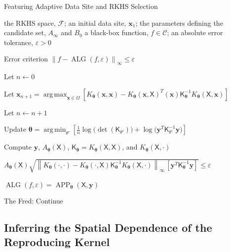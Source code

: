 \documentclass[]{mcom-l}
\theoremstyle{remark}
\DeclareMathOperator*{\argmax}{arg\,max}
\DeclareMathOperator*{\argmin}{arg\,min}
\DeclareMathOperator{\ALG}{ALG}
\DeclareMathOperator{\APP}{APP}
\newcommand{\mK}{\mathsf{K}}
\newcommand{\mX}{\mathsf{X}}
\newcommand{\bx}{{\boldsymbol{x}}}
\newcommand{\by}{{\boldsymbol{y}}}
\newcommand{\btheta}{{\boldsymbol{\theta}}}
\newcommand{\cc}{\mathcal{C}}
\newcommand{\calf}{{\mathcal{F}}}
\newcommand{\norm}[2][{}]{\ensuremath{\left \lVert #2 \right \rVert}_{#1}}
\newcommand{\FredNote}[1]{{\color{blue}Fred: #1}}
\begin{document}
\begin{algorithm}[H]
	\caption{Featuring Adaptive Data Site and RKHS Selection \label{alg:adaptsample}}
	\begin{algorithmic}
		\PARAM the RKHS space, $\calf$; an initial data site, $\bx_1$; the parameters defining the candidate set, $A_\infty$ and $B_0$
		\INPUT a black-box function, $f \in \cc$; an absolute error tolerance, $\varepsilon>0$
		
		\Ensure Error criterion $\norm[\infty]{f - \ALG(f,\varepsilon)} \le \varepsilon$
		
		\State Let $n \leftarrow 0$
		
		\Repeat
		
		
		\State Let $ \bx_{n+1} = \displaystyle \argmax_{\bx \in \Omega} [K_\btheta(\bx,\bx) - K_\btheta(\bx,\mX)^T(\bx) \mK_\btheta^{-1} K_\btheta(\mX,\bx)]$
		
		\EndIf
		
		\State Let $n \leftarrow n + 1$
		
		\State Update $\displaystyle\btheta = \argmin_{\theta'}  \left[\frac 1n \log \bigl( \det(\mK_{\theta'}) \bigr) + \log \bigl ( \by^T \mK_{\theta'}^{-1} \by \bigr)\right]$
		
		\State Compute $\by$, $A_\btheta(\mX)$, $\mK_\btheta = K_\btheta(\mX,\mX)$, and $K_\btheta(\mX,\cdot)$
		
		\Until $A_\btheta(\mX) \sqrt{\norm[\infty]{K_\btheta(\cdot,\cdot) - K_\btheta(\cdot,\mX) \mK_\btheta^{-1} K_\btheta(\mX,\cdot)} \, [\by^T \mK_\btheta^{-1} \by] }  \le \varepsilon$
		
		\RETURN $\ALG(f,\varepsilon) = \APP_\btheta(\mX,\by)$
		
	\end{algorithmic}
\end{algorithm}




The \FredNote{Continue}
\subsection{Inferring the Spatial Dependence of the Reproducing Kernel}


\end{document}
